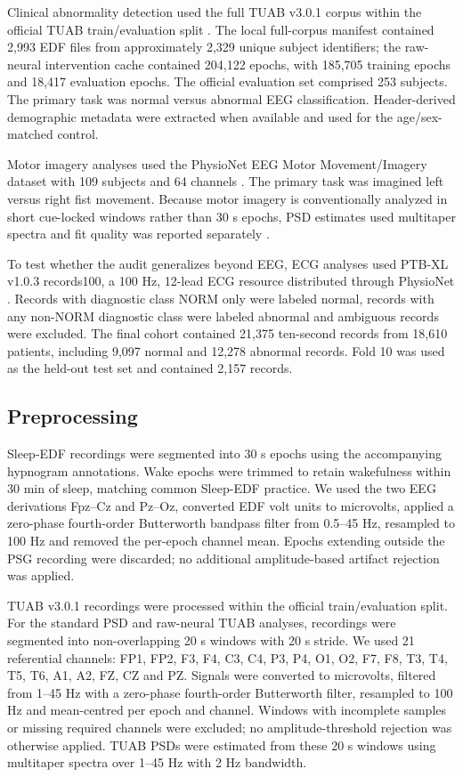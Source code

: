 \documentclass[pdflatex,sn-nature]{sn-jnl}
\begin{document}
Clinical abnormality detection used the full TUAB v3.0.1 corpus within the official TUAB train/evaluation split \cite{obeid2016tuh,gemein2020machine}. The local full-corpus manifest contained 2,993 EDF files from approximately 2,329 unique subject identifiers; the raw-neural intervention cache contained 204,122 epochs, with 185,705 training epochs and 18,417 evaluation epochs. The official evaluation set comprised 253 subjects. The primary task was normal versus abnormal EEG classification. Header-derived demographic metadata were extracted when available and used for the age/sex-matched control.

Motor imagery analyses used the PhysioNet EEG Motor Movement/Imagery dataset with 109 subjects and 64 channels \cite{schalk2004bci2000,goldberger2000physionet}. The primary task was imagined left versus right fist movement. Because motor imagery is conventionally analyzed in short cue-locked windows rather than 30 s epochs, PSD estimates used multitaper spectra and fit quality was reported separately \cite{pfurtscheller2001motor,thomson1982spectrum}.

To test whether the audit generalizes beyond EEG, ECG analyses used PTB-XL v1.0.3 records100, a 100 Hz, 12-lead ECG resource distributed through PhysioNet \cite{wagner2020ptbxl,goldberger2000physionet}. Records with diagnostic class NORM only were labeled normal, records with any non-NORM diagnostic class were labeled abnormal and ambiguous records were excluded. The final cohort contained 21,375 ten-second records from 18,610 patients, including 9,097 normal and 12,278 abnormal records. Fold 10 was used as the held-out test set and contained 2,157 records.

\subsection{Preprocessing}

Sleep-EDF recordings were segmented into 30 s epochs using the accompanying hypnogram annotations. Wake epochs were trimmed to retain wakefulness within 30 min of sleep, matching common Sleep-EDF practice. We used the two EEG derivations Fpz--Cz and Pz--Oz, converted EDF volt units to microvolts, applied a zero-phase fourth-order Butterworth bandpass filter from 0.5--45 Hz, resampled to 100 Hz and removed the per-epoch channel mean. Epochs extending outside the PSG recording were discarded; no additional amplitude-based artifact rejection was applied.

TUAB v3.0.1 recordings were processed within the official train/evaluation split. For the standard PSD and raw-neural TUAB analyses, recordings were segmented into non-overlapping 20 s windows with 20 s stride. We used 21 referential channels: FP1, FP2, F3, F4, C3, C4, P3, P4, O1, O2, F7, F8, T3, T4, T5, T6, A1, A2, FZ, CZ and PZ. Signals were converted to microvolts, filtered from 1--45 Hz with a zero-phase fourth-order Butterworth filter, resampled to 100 Hz and mean-centred per epoch and channel. Windows with incomplete samples or missing required channels were excluded; no amplitude-threshold rejection was otherwise applied. TUAB PSDs were estimated from these 20 s windows using multitaper spectra over 1--45 Hz with 2 Hz bandwidth.
\end{document}
